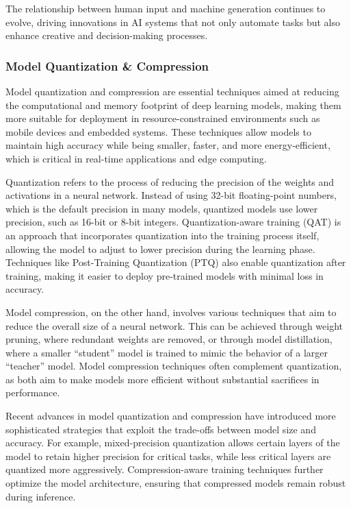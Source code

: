 \documentclass{article} %
\begin{document}
The relationship between human input and machine generation continues to evolve, driving innovations in AI systems that not only automate tasks but also enhance creative and decision-making processes.

\subsubsection{Model Quantization \& Compression}

Model quantization and compression are essential techniques aimed at reducing the computational and memory footprint of deep learning models, making them more suitable for deployment in resource-constrained environments such as mobile devices and embedded systems. These techniques allow models to maintain high accuracy while being smaller, faster, and more energy-efficient, which is critical in real-time applications and edge computing.

Quantization refers to the process of reducing the precision of the weights and activations in a neural network. Instead of using 32-bit floating-point numbers, which is the default precision in many models, quantized models use lower precision, such as 16-bit or 8-bit integers. Quantization-aware training (QAT) is an approach that incorporates quantization into the training process itself, allowing the model to adjust to lower precision during the learning phase. Techniques like Post-Training Quantization (PTQ) also enable quantization after training, making it easier to deploy pre-trained models with minimal loss in accuracy.

Model compression, on the other hand, involves various techniques that aim to reduce the overall size of a neural network. This can be achieved through weight pruning, where redundant weights are removed, or through model distillation, where a smaller “student” model is trained to mimic the behavior of a larger “teacher” model. Model compression techniques often complement quantization, as both aim to make models more efficient without substantial sacrifices in performance.

Recent advances in model quantization and compression have introduced more sophisticated strategies that exploit the trade-offs between model size and accuracy. For example, mixed-precision quantization allows certain layers of the model to retain higher precision for critical tasks, while less critical layers are quantized more aggressively. Compression-aware training techniques further optimize the model architecture, ensuring that compressed models remain robust during inference.
\end{document}
